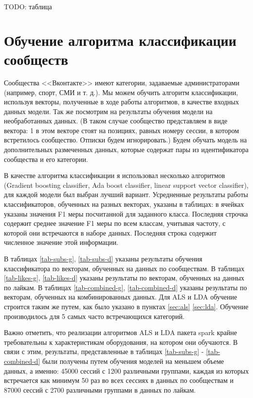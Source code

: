 \documentclass[times,specification,annotation]{itmo-student-thesis}
\begin{document}
TODO: таблица

\section{Обучение алгоритма классификации сообществ}\label{sec:class}

Сообщества <<Вконтакте>> имеют категории, задаваемые администраторами
(например, спорт, СМИ и т. д.). Мы можем обучить алгоритм классификации,
используя векторы, полученные в ходе работы алгоритмов, в качестве входных
данных модели. Так же посмотрим на результаты обучения модели на необработанных данных. (В таком случае сообщество представляем в виде вектора: 1 в этом векторе стоят на позициях, равных номеру сессии, в котором встретилось сообщество. Отписки будем игнорировать.)  
Будем обучать модель на дополнительных размеченных данных,
которые содержат пары из идентификатора сообщества и его категории.

В качестве алгоритма классификации я использовал несколько алгоритмов (Gradient boosting classifier, Ada boost classifier, linear support vector classifier), для каждой модели был выбран лучший вариант. Усредненные результаты работы классификаторов, обученных на разных векторах, указаны в таблицах: в ячейках указаны значения F1 меры посчитанной для заданного класса. Последняя строчка содержит среднее значение F1 меры по всем классам, учитывая частоту, с которой они встречаются в наборе данных. Последняя строка содержит численное значение этой информации.

В таблицах \ref{tab-subs-g}, \ref{tab-subs-d} указаны результаты обучения классификатора по векторам, обученных на данных по сообществам. В таблицах \ref{tab-likes-g}, \ref{tab-likes-d} указаны результаты по векторам, обученных на данных по лайкам. В таблицах \ref{tab-combined-g}, \ref{tab-combined-d} указаны результаты по векторам, обученных на комбинированных данных. Для ALS и LDA обучение строится таким же путем, как было указано в пунктах \ref{sec:als} \ref{sec:lda}. Обучение производилось для 5 самых часто встречающихся категорий.

Важно отметить, что реализации алгоритмов ALS и LDA пакета spark крайне требовательны к характеристикам оборудования, на котором они обучаются. В связи с этим, результаты, представленные в таблицах \ref{tab-subs-g} - \ref{tab-combined-d} были получены путем обучения моделей на меньшем объеме данных, а именно: 45000 сессий с 1200 различными группами, каждая из которых встречается как минимум 50 раз во всех сессиях в данных по сообществам и 87000 сессий с 2700 различными группами в данных по лайкам.
\end{document}

